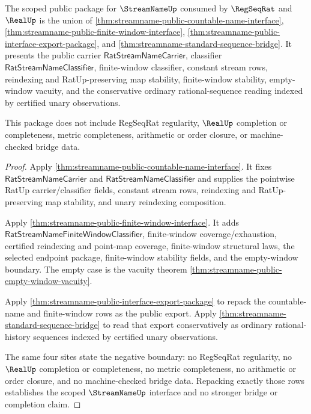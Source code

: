 \begin{theorem}
\label{thm:streamname-scoped-interface-package}
The scoped public package for $\StreamNameUp$ consumed by $\RegSeqRat$ and
$\RealUp$ is the union of
\autoref{thm:streamname-public-countable-name-interface},
\autoref{thm:streamname-public-finite-window-interface},
\autoref{thm:streamname-public-interface-export-package}, and
\autoref{thm:streamname-standard-sequence-bridge}.  It presents the public
carrier $\mathsf{RatStreamNameCarrier}$, classifier
$\mathsf{RatStreamNameClassifier}$, finite-window classifier, constant stream
rows, reindexing and RatUp-preserving map stability, finite-window stability,
empty-window vacuity, and the conservative ordinary rational-sequence reading
indexed by certified unary observations.

This package does not include RegSeqRat regularity, $\RealUp$ completion or
completeness, metric completeness, arithmetic or order closure, or
machine-checked bridge data.
\end{theorem}

\begin{proof}
Apply \autoref{thm:streamname-public-countable-name-interface}.  It fixes
$\mathsf{RatStreamNameCarrier}$ and
$\mathsf{RatStreamNameClassifier}$ and supplies the pointwise RatUp
carrier/classifier fields, constant stream rows, reindexing and
RatUp-preserving map stability, and unary reindexing composition.

Apply \autoref{thm:streamname-public-finite-window-interface}.  It adds
$\mathsf{RatStreamNameFiniteWindowClassifier}$, finite-window
coverage/exhaustion, certified reindexing and point-map coverage,
finite-window structural laws, the selected endpoint package, finite-window
stability fields, and the empty-window boundary.  The empty case is the
vacuity theorem \autoref{thm:streamname-public-empty-window-vacuity}.

Apply \autoref{thm:streamname-public-interface-export-package} to repack the
countable-name and finite-window rows as the public export.  Apply
\autoref{thm:streamname-standard-sequence-bridge} to read that export
conservatively as ordinary rational-history sequences indexed by certified
unary observations.

The same four sites state the negative boundary: no RegSeqRat regularity,
no $\RealUp$ completion or completeness, no metric completeness, no arithmetic
or order closure, and no machine-checked bridge data.  Repacking exactly those
rows establishes the scoped $\StreamNameUp$ interface and no stronger bridge
or completion claim.
\end{proof}

